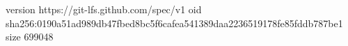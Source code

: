version https://git-lfs.github.com/spec/v1
oid sha256:0190a51ad989db47fbed8bc5f6cafea541389daa2236519178fe85fddb787be1
size 699048
